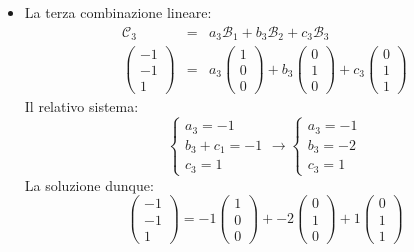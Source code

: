 \documentclass[a4paper]{article}
\begin{document}
\begin{itemize}
		\item La terza combinazione lineare:
		\begin{equation*}
			\begin{array}{rll}
				\mathcal{C}_{3} &=& a_{3}\mathcal{B}_{1} + b_{3}\mathcal{B}_{2} + c_{3}\mathcal{B}_{3} \\ [2em]
				\begin{pmatrix}
					-1 \\ -1 \\ 1
				\end{pmatrix} &=& a_{3} \begin{pmatrix}
					1 \\ 0 \\ 0
				\end{pmatrix} + b_{3} \begin{pmatrix}
					0 \\ 1 \\ 0
				\end{pmatrix} + c_{3} \begin{pmatrix}
					0 \\ 1 \\ 1
				\end{pmatrix}
			\end{array}
		\end{equation*}
		Il relativo sistema:
		\begin{equation*}
			\begin{cases}
				a_{3} = -1 \\
				b_{3} + c_{1} = -1 \\
				c_{3} = 1
			\end{cases} \longrightarrow
			\begin{cases}
				a_{3} = -1 \\
				b_{3} = -2 \\
				c_{3} = 1
			\end{cases}
		\end{equation*}
		La soluzione dunque:
		\begin{equation*}
			\begin{pmatrix}
				-1 \\ -1 \\ 1
			\end{pmatrix} = -1 \begin{pmatrix}
				1 \\ 0 \\ 0
			\end{pmatrix} + -2 \begin{pmatrix}
				0 \\ 1 \\ 0
			\end{pmatrix} + 1 \begin{pmatrix}
				0 \\ 1 \\ 1
			\end{pmatrix}
		\end{equation*}
	\end{itemize}
\end{document}
